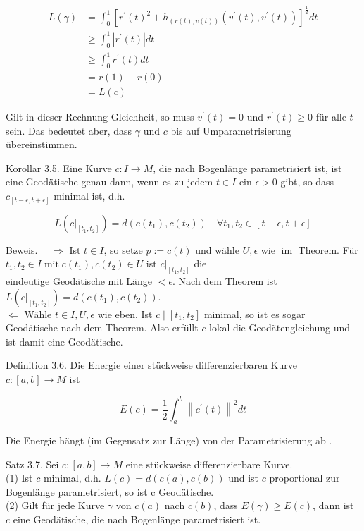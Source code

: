 \documentclass[10pt, letterpaper]{article}
\begin{document}
$$
\begin{aligned}
L(\gamma) & =\int_{0}^{1}\left[r^{\prime}(t)^{2}+h_{(r(t), v(t))}\left(v^{\prime}(t), v^{\prime}(t)\right)\right]^{\frac{1}{2}} d t \\
& \geq \int_{0}^{1}\left|r^{\prime}(t)\right| d t \\
& \geq \int_{0}^{1} r^{\prime}(t) d t \\
& =r(1)-r(0) \\
& =L(c)
\end{aligned}
$$

Gilt in dieser Rechnung Gleichheit, so muss $v^{\prime}(t)=0$ und $r^{\prime}(t) \geq 0$ für alle $t$ sein. Das bedeutet aber, dass $\gamma$ und $c$ bis auf Umparametrisierung übereinstimmen.

Korollar 3.5. Eine Kurve $c: I \rightarrow M$, die nach Bogenlänge parametrisiert ist, ist eine Geodätische genau dann, wenn es zu jedem $t \in I$ ein $\epsilon>0$ gibt, so dass $c_{[t-\epsilon, t+\epsilon]}$ minimal ist, d.h.

$$
L\left(\left.c\right|_{\left[t_{1}, t_{2}\right]}\right)=d\left(c\left(t_{1}\right), c\left(t_{2}\right)\right) \quad \forall t_{1}, t_{2} \in[t-\epsilon, t+\epsilon]
$$

Beweis. $\quad \Longrightarrow$ Ist $t \in I$, so setze $p:=c(t)$ und wähle $U, \epsilon$ wie $\operatorname{im}$ Theorem. Für $t_{1}, t_{2} \in I \operatorname{mit} c\left(t_{1}\right), c\left(t_{2}\right) \in U$ ist $\left.c\right|_{\left[t_{1}, t_{2}\right]}$ die\\
eindeutige Geodätische mit Länge $<\epsilon$. Nach dem Theorem ist $L\left(\left.c\right|_{\left[t_{1}, t_{2}\right]}\right)=d\left(c\left(t_{1}\right), c\left(t_{2}\right)\right)$.\\
$\Longleftarrow$ Wähle $t \in I, U, \epsilon$ wie eben. Ist $c \mid\left[t_{1}, t_{2}\right]$ minimal, so ist es sogar Geodätische nach dem Theorem. Also erfüllt $c$ lokal die Geodätengleichung und ist damit eine Geodätische.

Definition 3.6. Die Energie einer stückweise differenzierbaren Kurve $c:[a, b] \rightarrow M$ ist

$$
E(c)=\frac{1}{2} \int_{a}^{b}\left\|c^{\prime}(t)\right\|^{2} d t
$$

Die Energie hängt (im Gegensatz zur Länge) von der Parametrisierung ab .

Satz 3.7. Sei $c:[a, b] \rightarrow M$ eine stückweise differenzierbare Kurve.\\
(1) Ist $c$ minimal, d.h. $L(c)=d(c(a), c(b))$ und ist $c$ proportional zur Bogenlänge parametrisiert, so ist c Geodätische.\\
(2) Gilt für jede Kurve $\gamma$ von $c(a)$ nach $c(b)$, dass $E(\gamma) \geq E(c)$, dann ist $c$ eine Geodätische, die nach Bogenlänge parametrisiert ist.
\end{document}
